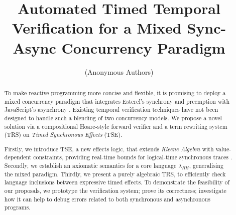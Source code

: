 \documentclass[acmsmall,review,anonymous]{acmart}\settopmatter{printfolios=true,printccs=false,printacmref=false}
\newcommand{\code}[1]{{\tt{\ensuremath{\m{#1}}}}}
\newcommand{\m}{\mathit}
\begin{document}
\title{Automated Timed Temporal Verification for a Mixed Sync-Async Concurrency Paradigm}





\author{(Anonymous Authors)}






\begin{abstract} 
To make reactive programming more concise and flexible, it is promising to deploy a mixed concurrency paradigm \cite{berry2020hiphop} that
integrates Esterel's synchrony and preemption \cite{berry1999constructive}  
with JavaScript's asynchrony \cite{madsen2017model}. 
Existing temporal verification techniques have not been designed to handle such a blending of two concurrency
models.
We propose a novel solution via a 
compositional 
Hoare-style forward verifier and a term rewriting system (TRS) on \emph{Timed Synchronous Effects} (TSE).  

Firstly, we introduce TSE, a new effects logic, that extends \emph{Kleene Algebra} with value-dependent constraints, providing real-time bounds for logical-time synchronous traces \cite{von2017real}. 
Secondly, we establish an axiomatic semantics  for a core language \code{\lambda_{HH}}, generalising the mixed paradigm. 
Thirdly, we present a purely algebraic TRS, to efficiently check language inclusions between expressive timed effects.  
To demonstrate the feasibility of our proposals, we prototype the  verification system; prove its correctness; investigate how it can help to debug errors related to both synchronous and asynchronous programs. 


\end{abstract}
\end{document}
